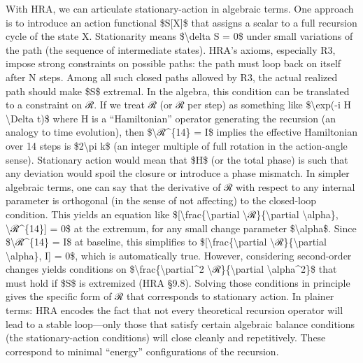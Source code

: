 \documentclass[]{article}
\begin{document}
With HRA, we can articulate stationary-action in algebraic terms. One
approach is to introduce an action functional \$S{[}X{]}\$ that assigns
a scalar to a full recursion cycle of the state X. Stationarity means
\$\textbackslash{}delta S = 0\$ under small variations of the path (the
sequence of intermediate states). HRA's axioms, especially R3, impose
strong constraints on possible paths: the path must loop back on itself
after N steps. Among all such closed paths allowed by R3, the actual
realized path should make \$S\$ extremal. In the algebra, this condition
can be translated to a constraint on ℛ. If we treat ℛ (or ℛ per step) as
something like \$\textbackslash{}exp(-i H \textbackslash{}Delta t)\$
where H is a ``Hamiltonian'' operator generating the recursion (an
analogy to time evolution), then \$\textbackslash{}ℛ\^{}\{14\} = I\$
implies the effective Hamiltonian over 14 steps is \$2\textbackslash{}pi
k\$ (an integer multiple of full rotation in the action-angle sense).
Stationary action would mean that \$H\$ (or the total phase) is such
that any deviation would spoil the closure or introduce a phase
mismatch. In simpler algebraic terms, one can say that the derivative of
ℛ with respect to any internal parameter is orthogonal (in the sense of
not affecting) to the closed-loop condition. This yields an equation
like \${[}\textbackslash{}frac\{\textbackslash{}partial
\textbackslash{}ℛ\}\{\textbackslash{}partial \textbackslash{}alpha\},
\textbackslash{}ℛ\^{}\{14\}{]} = 0\$ at the extremum, for any small
change parameter \$\textbackslash{}alpha\$. Since
\$\textbackslash{}ℛ\^{}\{14\} = I\$ at baseline, this simplifies to
\${[}\textbackslash{}frac\{\textbackslash{}partial
\textbackslash{}ℛ\}\{\textbackslash{}partial \textbackslash{}alpha\},
I{]} = 0\$, which is automatically true. However, considering
second-order changes yields conditions on
\$\textbackslash{}frac\{\textbackslash{}partial\^{}2
\textbackslash{}ℛ\}\{\textbackslash{}partial
\textbackslash{}alpha\^{}2\}\$ that must hold if \$S\$ is extremized
(HRA §9.8). Solving those conditions in principle gives the specific
form of ℛ that corresponds to stationary action. In plainer terms: HRA
encodes the fact that not every theoretical recursion operator will lead
to a stable loop---only those that satisfy certain algebraic balance
conditions (the stationary-action conditions) will close cleanly and
repetitively. These correspond to minimal ``energy'' configurations of
the recursion.
\end{document}
